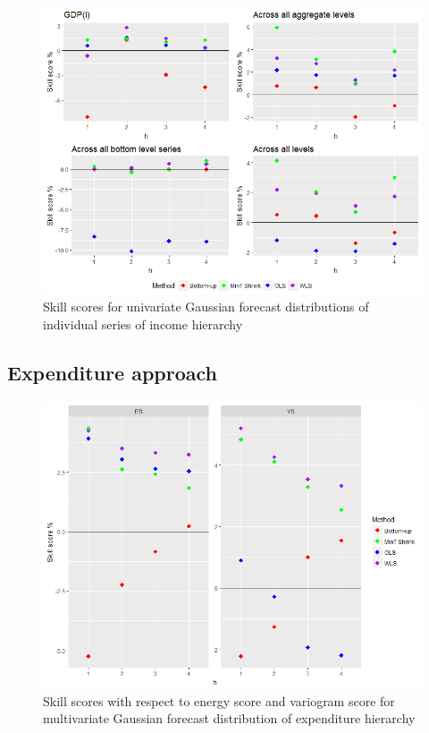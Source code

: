 \documentclass[graybox]{svmult}
\begin{document}
\begin{figure}[H]
	\centering
	\small
	\includegraphics[scale=0.50]{Figs/Results/INC-ProbNonParaF-UnivS_CRPS.PNG}
	\caption{Skill scores for univariate Gaussian forecast distributions of individual series of income hierarchy}\label{Inc_ProbNonParF_UnivS}
\end{figure}






\subsection*{Expenditure approach}

\begin{figure}[H]
	\centering
	\small
	\includegraphics[scale=0.50]{Figs/Results/EXP-ProbNonParaF-MultivS_ES_VS.PNG}
	\caption{Skill scores with respect to energy score and variogram score for multivariate Gaussian forecast distribution of expenditure hierarchy}\label{Exp_ProbNonParF_ES_VS}
\end{figure}
\end{document}
